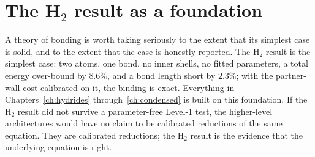 \section{The H$_2$ result as a foundation}\label{sec:h2-foundation}

A theory of bonding is worth taking seriously to the extent that its simplest case is solid, and to the extent that the case is honestly reported. The H$_2$ result is the simplest case: two atoms, one bond, no inner shells, no fitted parameters, a total energy over-bound by $8.6\%$, and a bond length short by $2.3\%$; with the partner-wall cost calibrated on it, the binding is exact. Everything in Chapters~\ref{ch:hydrides} through~\ref{ch:condensed} is built on this foundation. If the H$_2$ result did not survive a parameter-free Level-1 test, the higher-level architectures would have no claim to be calibrated reductions of the same equation. They are calibrated reductions; the H$_2$ result is the evidence that the underlying equation is right.

